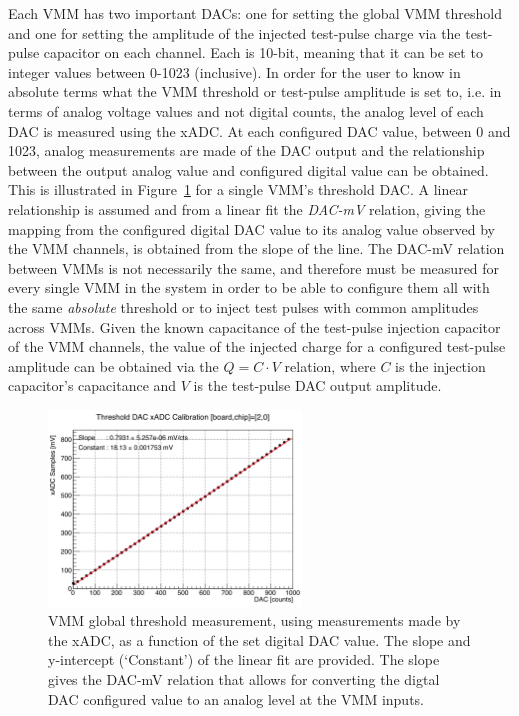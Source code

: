 Each VMM has two important DACs: one for setting the global VMM threshold and one for
setting the amplitude of the injected test-pulse charge via the test-pulse capacitor on each
channel.
Each is 10-bit, meaning that it can be set to integer values between 0-1023 (inclusive).
In order for the user to know in absolute terms what the VMM threshold or test-pulse amplitude
is set to, i.e. in terms of analog voltage values and not digital counts, the analog level of each
DAC is measured using the xADC.
At each configured DAC value, between 0 and 1023, analog measurements are made of the DAC output and
the relationship between the output analog value and configured digital value can be obtained.
This is illustrated in Figure~\ref{fig:threshold_dac_calib} for a single VMM's threshold DAC.
A linear relationship is assumed and from a linear fit the \textit{DAC-mV} relation, giving
the mapping from the configured digital DAC value to its analog value observed by the VMM channels, is obtained
from the slope of the line.
The DAC-mV relation between VMMs is not necessarily the same, and therefore must be measured
for every single VMM in the system in order to be able to configure them all with the
same \textit{absolute} threshold or to inject test pulses with common amplitudes across VMMs.
Given the known capacitance of the test-pulse injection capacitor of the VMM channels,
the value of the injected charge for a configured test-pulse amplitude can be obtained via the $Q = C \cdot V$
relation, where $C$ is the injection capacitor's capacitance and $V$ is the test-pulse DAC output amplitude.%

\begin{figure}[!htb]
    \begin{center}
        \includegraphics[width=0.6\textwidth]{figures/nsw/calibration/threshold_dac_calib}
        \caption{
            VMM global threshold measurement, using measurements made by the xADC, as a function
            of the set digital DAC value.
            The slope and y-intercept (`Constant') of the linear fit are provided.
            The slope gives the DAC-mV relation that allows for converting the digtal DAC
            configured value to an analog level at the VMM inputs.
        }
        \label{fig:threshold_dac_calib}
    \end{center}
\end{figure}

